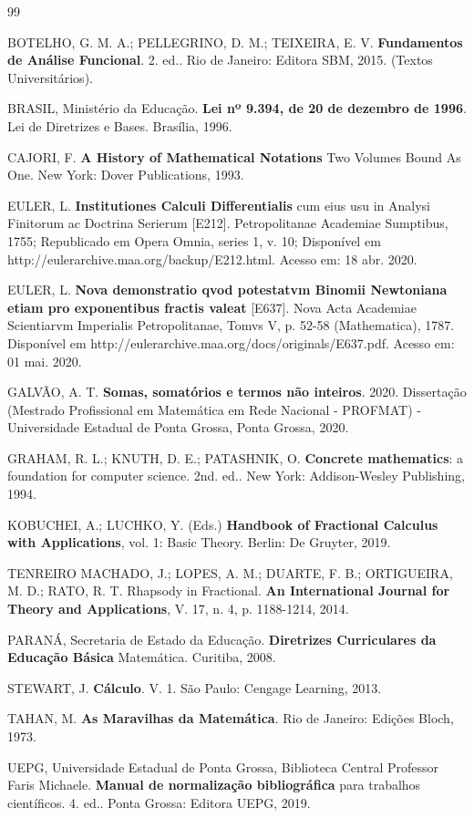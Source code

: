 \documentclass[a4paper,12pt]{report}%
\begin{document}
\begin{thebibliography}{99}
\thispagestyle{myheadings}

 BOTELHO, G. M. A.; PELLEGRINO, D. M.; TEIXEIRA, E. V. {\bf Fundamentos de Análise Funcional}. 2. ed.. Rio de Janeiro: Editora SBM, 2015. (Textos Universitários).
	
 BRASIL, Ministério da Educação. {\bf Lei nº 9.394, de 20 de dezembro de 1996}. Lei de Diretrizes e Bases. Brasília, 1996.

 CAJORI, F. {\bf A History of Mathematical Notations} Two Volumes Bound As One. New York: Dover Publications, 1993.

 EULER, L. {\bf Institutiones Calculi Differentialis} cum eius usu in Analysi Finitorum ac Doctrina Serierum [E212]. Petropolitanae Academiae Sumptibus, 1755; Republicado em Opera Omnia, series 1, v. 10; 
Disponível em http://eulerarchive.maa.org/backup/E212.html. Acesso em: 18 abr. 2020.

 EULER, L. {\bf Nova demonstratio qvod potestatvm Binomii Newtoniana etiam pro exponentibus fractis valeat} [E637]. Nova Acta Academiae Scientiarvm Imperialis Petropolitanae, Tomvs V, p. 52-58 (Mathematica), 1787. 
Disponível em http://eulerarchive.maa.org/docs/originals/E637.pdf. Acesso em: 01 mai. 2020.

 GALVÃO, A. T. {\bf Somas, somatórios e termos não inteiros}. 2020. Dissertação (Mestrado Profissional em Matemática em Rede Nacional - PROFMAT) - Universidade Estadual de Ponta Grossa, Ponta Grossa, 2020.

 GRAHAM, R. L.; KNUTH, D. E.; PATASHNIK, O. {\bf Concrete mathematics}: a foundation for computer science. 2nd. ed.. New York: Addison-Wesley Publishing, 1994. 

 KOBUCHEI, A.; LUCHKO, Y. (Eds.) {\bf Handbook of Fractional Calculus with Applications}, vol. 1: Basic Theory. Berlin: De Gruyter, 2019.

 TENREIRO MACHADO, J.; LOPES, A. M.; DUARTE, F. B.; ORTIGUEIRA, M. D.; RATO, R. T. Rhapsody in Fractional. {\bf An International Journal for Theory and Applications}, V. 17, n. 4, p. 1188-1214, 2014.

 PARANÁ, Secretaria de Estado da Educação. {\bf Diretrizes Curriculares da Educação Básica} Matemática. Curitiba, 2008.

 STEWART, J. {\bf Cálculo}. V. 1. São Paulo: Cengage Learning, 2013.

 TAHAN, M. {\bf As Maravilhas da Matemática}. Rio de Janeiro: Edições Bloch, 1973.

 UEPG, Universidade Estadual de Ponta Grossa, Biblioteca Central Professor Faris Michaele. {\bf Manual de normalização bibliográfica} para trabalhos científicos. 4. ed.. Ponta Grossa: Editora UEPG, 2019. 
	
\end{thebibliography}
\end{document}
